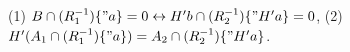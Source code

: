 (1) $B \cap (R_1^{-1}) \{"a\} = 0 \leftrightarrow H'b \cap (R_2^{-1}) \{"H'a\} = 0$,
(2) $H'(A_1 \cap (R_1^{-1}) \{"a\}) = A_2 \cap (R_2^{-1}) \{"H'a\}$.
